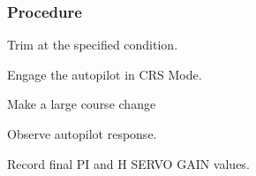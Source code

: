  \subsubsection*{Procedure}
 \begin{compactenum}
    \item Trim at the specified condition.
    \item Engage the autopilot in CRS Mode.
    \item Make a large course change 
    \item Observe autopilot response.
    \item Record final PI and H SERVO GAIN values.
    \end{compactenum}
